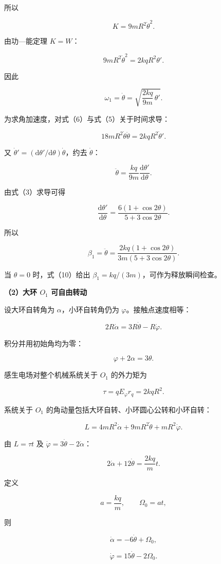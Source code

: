 \documentclass[12pt,a4paper,UTF8]{ctexart}
\begin{document}
所以

\[K=9mR^2\dot\theta^2. \tag{6}\]

由功---能定理 \(K=W\)：

\[9mR^2\dot\theta^2=2kqR^2\theta'.\]

因此

\[\boxed{
\omega_1=\dot\theta
=\sqrt{\frac{2kq}{9m}\,\theta'}
}. \tag{7}\]

为求角加速度，对式（6）与式（5）关于时间求导：

\[18mR^2\dot\theta\ddot\theta
=2kqR^2\dot\theta'.\]

又 \(\dot\theta'=(\mathrm d\theta'/\mathrm d\theta)\dot\theta\)，约去
\(\dot\theta\)：

\[\ddot\theta=\frac{kq}{9m}\frac{\mathrm d\theta'}{\mathrm d\theta}. \tag{8}\]

由式（3）求导可得

\[\frac{\mathrm d\theta'}{\mathrm d\theta}
=\frac{6(1+\cos2\theta)}{5+3\cos2\theta}. \tag{9}\]

所以

\[\boxed{
\beta_1=\ddot\theta
=\frac{2kq(1+\cos2\theta)}{3m(5+3\cos2\theta)}
}. \tag{10}\]

当 \(\theta=0\) 时，式（10）给出
\(\beta_1=kq/(3m)\)，可作为释放瞬间检查。

\textbf{（2）大环 \(O_1\) 可自由转动}

设大环自转角为 \(\alpha\)，小环自转角仍为 \(\varphi\)。接触点速度相等：

\[2R\dot\alpha=3R\dot\theta-R\dot\varphi.\]

积分并用初始角均为零：

\[\boxed{\varphi+2\alpha=3\theta}. \tag{11}\]

感生电场对整个机械系统关于 \(O_1\) 的外力矩为

\[\tau=qE_\varphi r_q=2kqR^2. \tag{12}\]

系统关于 \(O_1\) 的角动量包括大环自转、小环圆心公转和小环自转：

\[L=4mR^2\dot\alpha+9mR^2\dot\theta+mR^2\dot\varphi. \tag{13}\]

由 \(L=\tau t\) 及 \(\dot\varphi=3\dot\theta-2\dot\alpha\)：

\[2\dot\alpha+12\dot\theta=\frac{2kq}{m}t.\]

定义

\[a=\frac{kq}{m},\qquad \Omega_0=at,\]

则

\[\boxed{\dot\alpha=-6\dot\theta+\Omega_0},\]

\[\boxed{\dot\varphi=15\dot\theta-2\Omega_0}. \tag{14}\]
\end{document}
